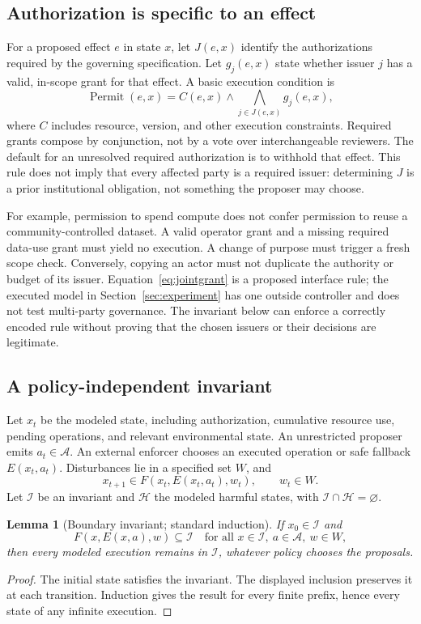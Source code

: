 \documentclass[10pt,twocolumn,letterpaper]{article}
\newtheorem{lemma}{Lemma}
\newcommand{\I}{\mathcal I}
\newcommand{\Hh}{\mathcal H}
\newcommand{\A}{\mathcal A}
\begin{document}
\subsection{Authorization is specific to an effect}
For a proposed effect $e$ in state $x$, let $J(e,x)$ identify the authorizations required by the governing specification. Let $g_j(e,x)$ state whether issuer $j$ has a valid, in-scope grant for that effect. A basic execution condition is
\begin{equation}
\operatorname{Permit}(e,x)=C(e,x)\wedge\bigwedge_{j\in J(e,x)}g_j(e,x),
\label{eq:jointgrant}
\end{equation}
where $C$ includes resource, version, and other execution constraints. Required grants compose by conjunction, not by a vote over interchangeable reviewers. The default for an unresolved required authorization is to withhold that effect. This rule does not imply that every affected party is a required issuer: determining $J$ is a prior institutional obligation, not something the proposer may choose.

For example, permission to spend compute does not confer permission to reuse a community-controlled dataset. A valid operator grant and a missing required data-use grant must yield no execution. A change of purpose must trigger a fresh scope check. Conversely, copying an actor must not duplicate the authority or budget of its issuer. Equation~\eqref{eq:jointgrant} is a proposed interface rule; the executed model in Section~\ref{sec:experiment} has one outside controller and does not test multi-party governance. The invariant below can enforce a correctly encoded rule without proving that the chosen issuers or their decisions are legitimate.

\subsection{A policy-independent invariant}
Let $x_t$ be the modeled state, including authorization, cumulative resource use, pending operations, and relevant environmental state. An unrestricted proposer emits $a_t\in\A$. An external enforcer chooses an executed operation or safe fallback $E(x_t,a_t)$. Disturbances lie in a specified set $W$, and
\[
x_{t+1}\in F(x_t,E(x_t,a_t),w_t),\qquad w_t\in W.
\]
Let $\I$ be an invariant and $\Hh$ the modeled harmful states, with $\I\cap\Hh=\varnothing$.

\begin{lemma}[Boundary invariant; standard induction]
\label{lem:invariant}
If $x_0\in\I$ and
\[
F(x,E(x,a),w)\subseteq\I
\quad\text{for all }x\in\I,\ a\in\A,\ w\in W,
\]
then every modeled execution remains in $\I$, whatever policy chooses the proposals.
\end{lemma}
\begin{proof}
The initial state satisfies the invariant. The displayed inclusion preserves it at each transition. Induction gives the result for every finite prefix, hence every state of any infinite execution.
\end{proof}
\end{document}
